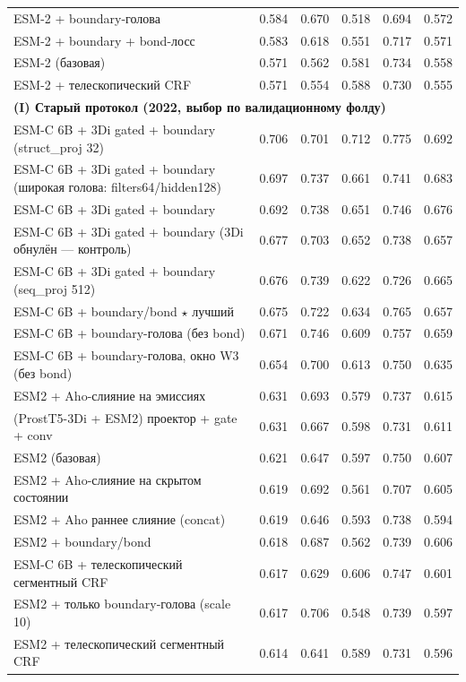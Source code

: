 \begin{longtable}{p{7.2cm} r r r r r}
ESM-2 + boundary-голова & 0.584 & 0.670 & 0.518 & 0.694 & 0.572 \\
ESM-2 + boundary + bond-лосс & 0.583 & 0.618 & 0.551 & 0.717 & 0.571 \\
ESM-2 (базовая) & 0.571 & 0.562 & 0.581 & 0.734 & 0.558 \\
ESM-2 + телескопический CRF & 0.571 & 0.554 & 0.588 & 0.730 & 0.555 \\
\hline \multicolumn{6}{l}{\textbf{\small (I) Старый протокол (2022, выбор по валидационному фолду)}}\\ \hline
ESM-C 6B + 3Di gated + boundary (struct\_proj 32) & 0.706 & 0.701 & 0.712 & 0.775 & 0.692 \\
ESM-C 6B + 3Di gated + boundary (широкая голова: filters64/hidden128) & 0.697 & 0.737 & 0.661 & 0.741 & 0.683 \\
ESM-C 6B + 3Di gated + boundary & 0.692 & 0.738 & 0.651 & 0.746 & 0.676 \\
ESM-C 6B + 3Di gated + boundary (3Di обнулён — контроль) & 0.677 & 0.703 & 0.652 & 0.738 & 0.657 \\
ESM-C 6B + 3Di gated + boundary (seq\_proj 512) & 0.676 & 0.739 & 0.622 & 0.726 & 0.665 \\
ESM-C 6B + boundary/bond  \ensuremath{\star} лучший & 0.675 & 0.722 & 0.634 & 0.765 & 0.657 \\
ESM-C 6B + boundary-голова (без bond) & 0.671 & 0.746 & 0.609 & 0.757 & 0.659 \\
ESM-C 6B + boundary-голова, окно W3 (без bond) & 0.654 & 0.700 & 0.613 & 0.750 & 0.635 \\
ESM2 + Aho-слияние на эмиссиях & 0.631 & 0.693 & 0.579 & 0.737 & 0.615 \\
(ProstT5-3Di + ESM2) проектор + gate + conv & 0.631 & 0.667 & 0.598 & 0.731 & 0.611 \\
ESM2 (базовая) & 0.621 & 0.647 & 0.597 & 0.750 & 0.607 \\
ESM2 + Aho-слияние на скрытом состоянии & 0.619 & 0.692 & 0.561 & 0.707 & 0.605 \\
ESM2 + Aho раннее слияние (concat) & 0.619 & 0.646 & 0.593 & 0.738 & 0.594 \\
ESM2 + boundary/bond & 0.618 & 0.687 & 0.562 & 0.739 & 0.606 \\
ESM-C 6B + телескопический сегментный CRF & 0.617 & 0.629 & 0.606 & 0.747 & 0.601 \\
ESM2 + только boundary-голова (scale 10) & 0.617 & 0.706 & 0.548 & 0.739 & 0.597 \\
ESM2 + телескопический сегментный CRF & 0.614 & 0.641 & 0.589 & 0.731 & 0.596 \\

\end{longtable}
